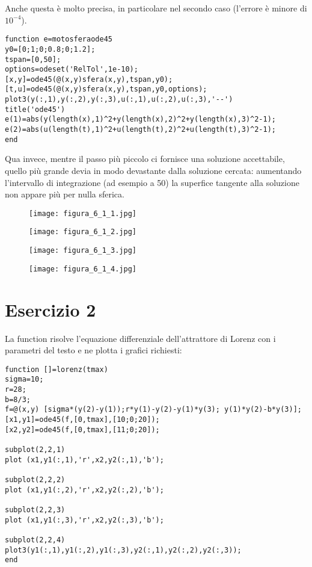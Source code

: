 \documentclass{article}
\begin{document}
Anche questa \`{e} molto precisa, in particolare nel secondo caso (l'errore è minore di $10^{-4}$).
\begin{lstlisting}
function e=motosferaode45
y0=[0;1;0;0.8;0;1.2];
tspan=[0,50];
options=odeset('RelTol',1e-10);
[x,y]=ode45(@(x,y)sfera(x,y),tspan,y0);
[t,u]=ode45(@(x,y)sfera(x,y),tspan,y0,options);
plot3(y(:,1),y(:,2),y(:,3),u(:,1),u(:,2),u(:,3),'--')
title('ode45')
e(1)=abs(y(length(x),1)^2+y(length(x),2)^2+y(length(x),3)^2-1);
e(2)=abs(u(length(t),1)^2+u(length(t),2)^2+u(length(t),3)^2-1);
end
\end{lstlisting}
Qua invece, mentre il passo più piccolo ci fornisce una soluzione accettabile, quello più grande devia in modo devastante dalla soluzione cercata: aumentando l'intervallo di integrazione (ad esempio a 50) la superfice tangente alla soluzione non appare più per nulla sferica.

\newpage

\begin{figure}[!h]
\centering
\texttt{[image: figura\_6\_1\_1.jpg]}
\end{figure}

\begin{figure}[!h]
\centering
\texttt{[image: figura\_6\_1\_2.jpg]}
\end{figure}


\begin{figure}[!h]
\centering
\texttt{[image: figura\_6\_1\_3.jpg]}
\end{figure}

\newpage

\begin{figure}[!h]
\centering
\texttt{[image: figura\_6\_1\_4.jpg]}
\end{figure}

\newpage


\section*{Esercizio 2}

La function risolve l'equazione differenziale dell'attrattore di Lorenz con i parametri del testo e ne plotta i grafici richiesti:
\begin{lstlisting}
function []=lorenz(tmax)
sigma=10;
r=28;
b=8/3;
f=@(x,y) [sigma*(y(2)-y(1));r*y(1)-y(2)-y(1)*y(3); y(1)*y(2)-b*y(3)];
[x1,y1]=ode45(f,[0,tmax],[10;0;20]);
[x2,y2]=ode45(f,[0,tmax],[11;0;20]);

subplot(2,2,1) 
plot (x1,y1(:,1),'r',x2,y2(:,1),'b');

subplot(2,2,2) 
plot (x1,y1(:,2),'r',x2,y2(:,2),'b');

subplot(2,2,3)
plot (x1,y1(:,3),'r',x2,y2(:,3),'b');

subplot(2,2,4) 
plot3(y1(:,1),y1(:,2),y1(:,3),y2(:,1),y2(:,2),y2(:,3));
end
\end{lstlisting}
\end{document}

